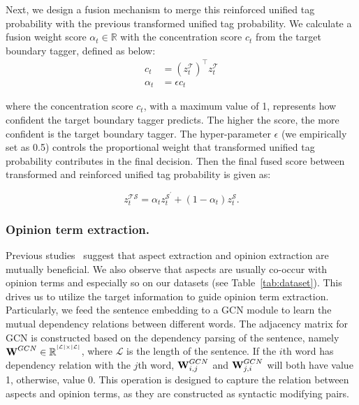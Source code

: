 \documentclass[letterpaper]{article} \usepackage{aaai20}  \usepackage{times}  \usepackage{helvet} \usepackage{courier}  \usepackage[hyphens]{url}  \usepackage{graphicx} \urlstyle{rm} \def\UrlFont{\rm}  \usepackage{graphicx}  \frenchspacing  \setlength{\pdfpagewidth}{8.5in}  \setlength{\pdfpageheight}{11in}
\begin{document}
Next, we design a fusion mechanism to merge this reinforced unified tag probability with the previous transformed unified tag probability. We calculate a fusion weight score $\alpha_t \in \mathbb{R}$ with the concentration score $c_t$ from the target boundary tagger, defined as below:
\begin{equation}
\begin{split}
    c_t &= (z^{\mathcal{T}}_t)^{\top} z^{\mathcal{T}}_t \\
    \alpha_t &= \epsilon c_t
\end{split}
\end{equation}


where the concentration score $c_t$, with a maximum value of 1, represents how confident the target boundary tagger predicts. The higher the score, the more confident is the target boundary tagger. The hyper-parameter $\epsilon$ (we empirically set as 0.5) controls the proportional weight that transformed unified tag probability contributes in the final decision. Then the final fused score between transformed and reinforced unified tag probability is given as:

\begin{equation}
    {z}^{\mathcal{TS}}_t = \alpha_t z^{\mathcal{S}^{'}}_t + (1-\alpha_t) z^{\mathcal{S}}_t.
\end{equation}




\subsubsection{Opinion term extraction.}
Previous studies~\cite{wang2017coupled,dai2019neural} suggest that aspect extraction and opinion extraction are mutually beneficial. We also observe that aspects are usually co-occur with opinion terms and especially so on our datasets (see Table~\ref{tab:dataset}). This drives us to utilize the target information to guide opinion term extraction.
Particularly, we feed the sentence embedding to a GCN module to learn the mutual dependency relations between different words. The adjacency matrix for GCN is constructed based on the dependency parsing of the sentence, namely $\text{\bf W}^{GCN} \in \mathbb{R}^{^{{\mathcal{|L|}} \times {\mathcal{|L|}}}}$, where $\mathcal{L}$ is the length of the sentence. If the $i$th word has dependency relation with the $j$th word, $\text{\bf W}^{GCN}_{i,j}$ and $\text{\bf W}^{GCN}_{j,i}$ will both have value 1, otherwise, value 0. This operation is designed to capture the relation between aspects and opinion terms, as they are constructed as syntactic modifying pairs.
\end{document}
